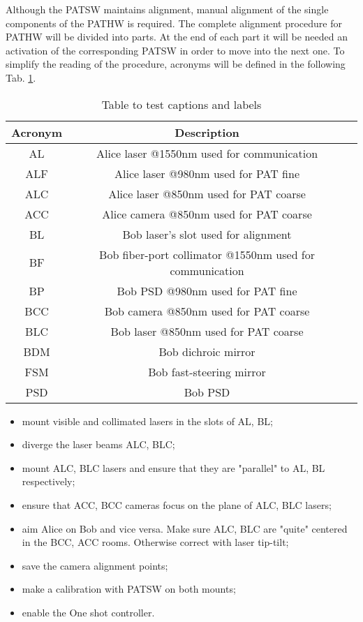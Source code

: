Although the PATSW maintains alignment, manual alignment of the single components of the PATHW is required.
The complete alignment procedure for PATHW will be divided into parts. At the end of each part it will be needed an activation of the corresponding PATSW in order to move into the next one. To simplify the reading of the procedure, acronyms will be defined in the following Tab. \ref{table:1}.
\begin{table}[h!]
  \centering
  \begin{tabular}{ |c|c|c| }
    \hline
    Acronym & Description                                              \\
    \hline
    AL      & Alice laser @1550nm used for communication               \\
    ALF     & Alice laser @980nm used for PAT fine                     \\
    ALC     & Alice laser @850nm used for PAT coarse                   \\
    ACC     & Alice camera @850nm used for PAT coarse                  \\
    \hline
    BL      & Bob laser's slot used for alignment                      \\
    BF      & Bob fiber-port collimator @1550nm used for communication \\
    BP      & Bob PSD @980nm used for PAT fine                         \\
    BCC     & Bob camera @850nm used for PAT coarse                    \\
    BLC     & Bob laser @850nm used for PAT coarse                     \\
    BDM     & Bob dichroic mirror                                      \\
    FSM     & Bob fast-steering mirror                                 \\
    PSD     & Bob PSD                                                  \\
    \hline
  \end{tabular}
  \caption{Table to test captions and labels}
  \label{table:1}
\end{table}

\begin{itemize}
  \item mount visible and collimated lasers in the slots of AL, BL;
  \item diverge the laser beams ALC, BLC;
  \item mount ALC, BLC lasers and ensure that they are "parallel" to AL, BL respectively;
  \item ensure that ACC, BCC cameras focus on the plane of ALC, BLC lasers;
  \item aim Alice on Bob and vice versa. Make sure ALC, BLC are "quite" centered in the BCC, ACC rooms. Otherwise correct with laser tip-tilt;
  \item save the camera alignment points;
  \item make a calibration with PATSW on both mounts;
  \item enable the One shot controller.
\end{itemize}


